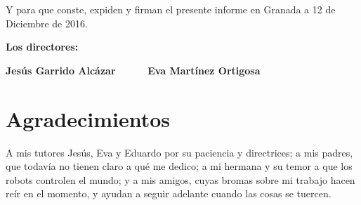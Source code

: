 \vspace{0.5cm}

Y para que conste, expiden y firman el presente informe en Granada a 12 de Diciembre de 2016.

\vspace{1cm}

\textbf{Los directores:}

\vspace{5cm}

\noindent \textbf{Jesús Garrido Alcázar \ \ \ \ \ Eva Martínez Ortigosa}

\chapter*{Agradecimientos}
\thispagestyle{empty}

       \vspace{1cm}

A mis tutores Jesús, Eva y Eduardo por su paciencia y directrices; a mis padres, que todavía no tienen claro a qué me dedico; a mi hermana y su temor a que los robots controlen el mundo; y a mis amigos, cuyas bromas sobre mi trabajo hacen reír en el momento, y ayudan a seguir adelante cuando las cosas se tuercen.

